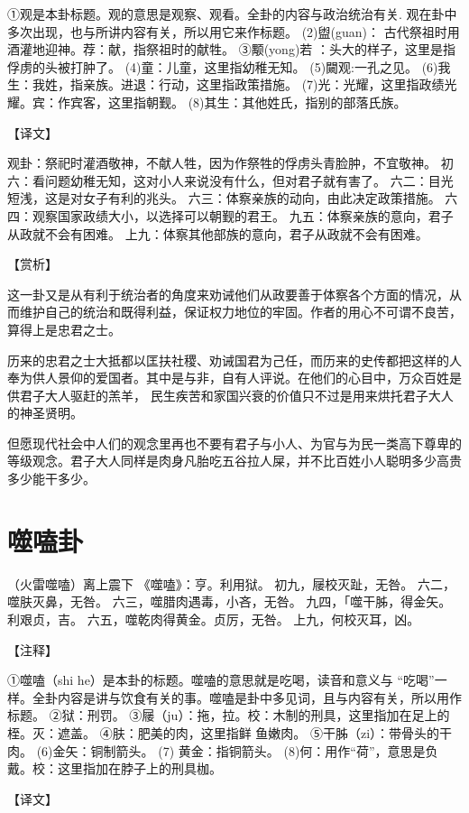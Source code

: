 \documentclass[a4paper,12pt,UTF8,twoside]{ctexbook}
\begin{document}
①观是本卦标题。观的意思是观察、观看。全卦的内容与政治统治有关. 观在卦中多次出现，也与所讲内容有关，所以用它来作标题。
(2)盥(guan)： 古代祭祖时用酒灌地迎神。荐：献，指祭祖时的献牲。
③颙(yong)若 ：头大的样子，这里是指俘虏的头被打肿了。
(4)童：儿童，这里指幼稚无知。
(5)闚观:一孔之见。
(6)我生：我姓，指亲族。进退：行动，这里指政策措施。
(7)光：光耀，这里指政绩光耀。宾：作宾客，这里指朝觐。
(8)其生：其他姓氏，指别的部落氏族。

【译文】

观卦：祭祀时灌酒敬神，不献人牲，因为作祭牲的俘虏头青脸肿，不宜敬神。
初六：看问题幼稚无知，这对小人来说没有什么，但对君子就有害了。
六二：目光短浅，这是对女子有利的兆头。
六三：体察亲族的动向，由此决定政策措施。
六四：观察国家政绩大小，以选择可以朝觐的君王。
九五：体察亲族的意向，君子从政就不会有困难。
上九：体察其他部族的意向，君子从政就不会有困难。

【赏析】

这一卦又是从有利于统治者的角度来劝诫他们从政要善于体察各个方面的情况，从而维护自己的统治和既得利益，保证权力地位的牢固。作者的用心不可谓不良苦，算得上是忠君之士。

历来的忠君之士大抵都以匡扶社稷、劝诫国君为己任，而历来的史传都把这样的人奉为供人景仰的爱国者。其中是与非，自有人评说。在他们的心目中，万众百姓是供君子大人驱赶的羔羊， 民生疾苦和家国兴衰的价值只不过是用来烘托君子大人的神圣贤明。

但愿现代社会中人们的观念里再也不要有君子与小人、为官与为民一类高下尊卑的等级观念。君子大人同样是肉身凡胎吃五谷拉人屎，并不比百姓小人聪明多少高贵多少能干多少。

\chapter{噬嗑卦}

（火雷噬嗑）离上震下
《噬嗑》：亨。利用狱。
初九，屦校灭趾，无咎。
六二，噬肤灭鼻，无咎。
六三，噬腊肉遇毒，小吝，无咎。
九四，「噬干胏，得金矢。利艰贞，吉。
六五，噬乾肉得黄金。贞厉，无咎。
上九，何校灭耳，凶。

【注释】

①噬嗑（shi he）是本卦的标题。噬嗑的意思就是吃喝，读音和意义与 “吃喝”一样。全卦内容是讲与饮食有关的事。噬嗑是卦中多见词，且与内容有关，所以用作标题。
②狱：刑罚。
③屦（ju）：拖，拉。校：木制的刑具，这里指加在足上的桎。灭：遮盖。
④肤：肥美的肉，这里指鲜 鱼嫩肉。
⑤干胏（zi）：带骨头的干肉。
(6)金矢：铜制箭头。
(7) 黄金：指铜箭头。
(8)何：用作“荷”，意思是负戴。校：这里指加在脖子上的刑具枷。

【译文】
\end{document}
